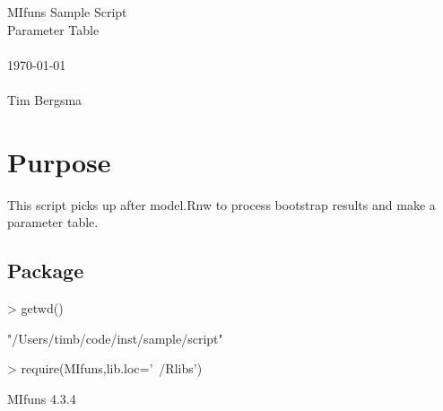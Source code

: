 
\usepackage{Sweave}

 

\vspace*{2cm}
\begin{center}
{\Large MIfuns Sample Script}\\
\vspace{1.5cm}
{\Large Parameter Table}\\
~\\
\today\\
~\\
Tim Bergsma\\
\end{center}
\newpage

\section{Purpose}
This script picks up after model.Rnw to process bootstrap results and make a parameter table.
\subsection{Package}
\begin{Schunk}
\begin{Sinput}
> getwd()
\end{Sinput}
\begin{Soutput}
[1] "/Users/timb/code/inst/sample/script"
\end{Soutput}
\begin{Sinput}
> require(MIfuns,lib.loc='~/Rlibs')
\end{Sinput}
\begin{Soutput}
MIfuns 4.3.4 
\end{Soutput}
\end{Schunk}
